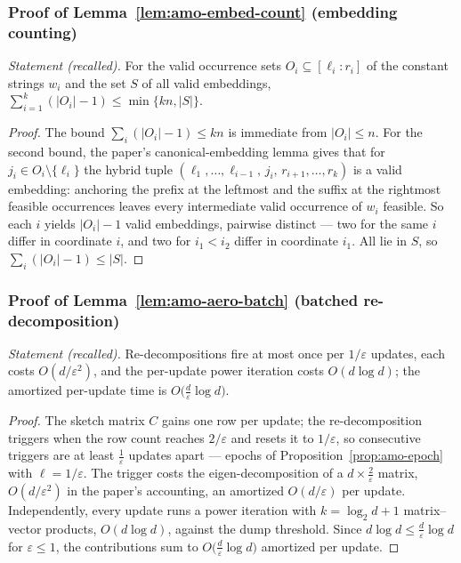\subsubsection*{Proof of Lemma~\ref{lem:amo-embed-count} (embedding counting)}
{\itshape Statement (recalled).} For the valid occurrence sets $O_i \subseteq
[\ell_i : r_i]$ of the constant strings $w_i$ and the set $S$ of all valid
embeddings, $\sum_{i=1}^{k} (|O_i| - 1) \le \min\{kn, |S|\}$.\eop

\begin{proof}
The bound $\sum_i (|O_i| - 1) \le kn$ is immediate from $|O_i| \le n$. For
the second bound, the paper's canonical-embedding lemma gives that for
$j_i \in O_i \setminus\{\ell_i\}$ the hybrid tuple $(\ell_1, \dots,
\ell_{i-1},\, j_i,\, r_{i+1}, \dots, r_k)$ is a valid embedding: anchoring
the prefix at the leftmost and the suffix at the rightmost feasible
occurrences leaves every intermediate valid occurrence of $w_i$ feasible.
So each $i$ yields $|O_i| - 1$ valid embeddings, pairwise distinct --- two
for the same $i$ differ in coordinate $i$, and two for $i_1 < i_2$ differ in
coordinate $i_1$. All lie in $S$, so $\sum_i (|O_i| - 1) \le |S|$.
\end{proof}

\subsubsection*{Proof of Lemma~\ref{lem:amo-aero-batch} (batched
re-decomposition)}
{\itshape Statement (recalled).} Re-decompositions fire at most once per
$1/\varepsilon$ updates, each costs $O(d/\varepsilon^{2})$, and the
per-update power iteration costs $O(d \log d)$; the amortized per-update
time is $O\bigl(\tfrac{d}{\varepsilon} \log d\bigr)$.\eop

\begin{proof}
The sketch matrix $C$ gains one row per update; the re-decomposition
triggers when the row count reaches $2/\varepsilon$ and resets it to
$1/\varepsilon$, so consecutive triggers are at least $\tfrac{1}{\varepsilon}$
updates apart --- epochs of Proposition~\ref{prop:amo-epoch} with
$\ell = 1/\varepsilon$. The trigger costs the eigen-decomposition of a
$d \times \tfrac{2}{\varepsilon}$ matrix, $O(d/\varepsilon^{2})$ in the
paper's accounting, an amortized $O(d/\varepsilon)$ per update.
Independently, every update runs a power iteration with $k = \log_2 d + 1$
matrix--vector products, $O(d\log d)$, against the dump threshold. Since
$d \log d \le \tfrac{d}{\varepsilon} \log d$ for $\varepsilon \le 1$, the
contributions sum to $O\bigl(\tfrac{d}{\varepsilon} \log d\bigr)$
amortized per update.
\end{proof}

